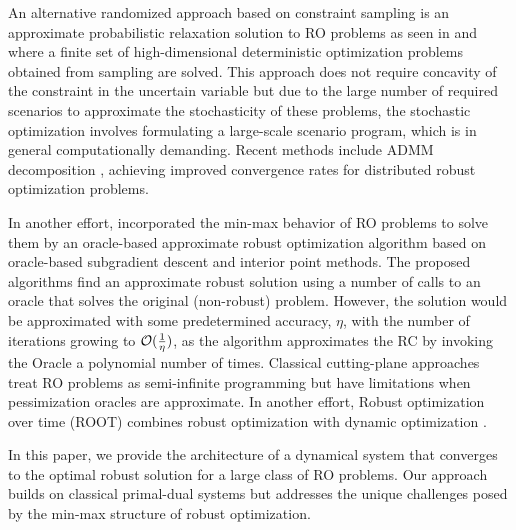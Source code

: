 \documentclass[journal,twoside,web]{ieeecolor}
\newcommand{\rev}[1]{\textcolor{revisionblue}{#1}}
\begin{document}
An alternative randomized approach based on constraint sampling is an approximate probabilistic relaxation solution to RO problems as seen in \cite{calafiore2004} and \cite{calafiore2010} where a finite set of high-dimensional deterministic optimization problems obtained from sampling are solved. This approach does not require concavity of the constraint in the uncertain variable but due to the large number of required scenarios to approximate the stochasticity of these problems, the stochastic optimization involves formulating a large-scale scenario program, which is in general computationally demanding.
\rev{Recent methods include ADMM decomposition \cite{rostampour2021}, achieving improved convergence rates for distributed robust optimization problems.}

In another effort, \cite{bental2015} incorporated the min-max behavior of RO problems to solve them by an oracle-based approximate robust optimization algorithm based on oracle-based subgradient descent and interior point methods. The proposed algorithms find an approximate robust solution using a number of calls to an oracle that solves the original (non-robust) problem. However, the solution would be approximated with some predetermined accuracy, $\eta$, with the number of iterations growing to ${\cal O}(\frac{1}{\eta})$, as the algorithm approximates the RC by invoking the Oracle a polynomial number of times.
\rev{Classical cutting-plane approaches \cite{mutapcic2009} treat RO problems as semi-infinite programming but have limitations when pessimization oracles are approximate.} In another effort, \rev{Robust optimization over time (ROOT) combines robust optimization with dynamic optimization \cite{yazdani2023,aigner2023}.}

In this paper, we provide the architecture of a dynamical system that converges to the optimal robust solution for a large class of RO problems. Our approach builds on classical primal-dual systems \cite{arrow1958,feijer2010} but addresses the unique challenges posed by the min-max structure of robust optimization.
\end{document}
